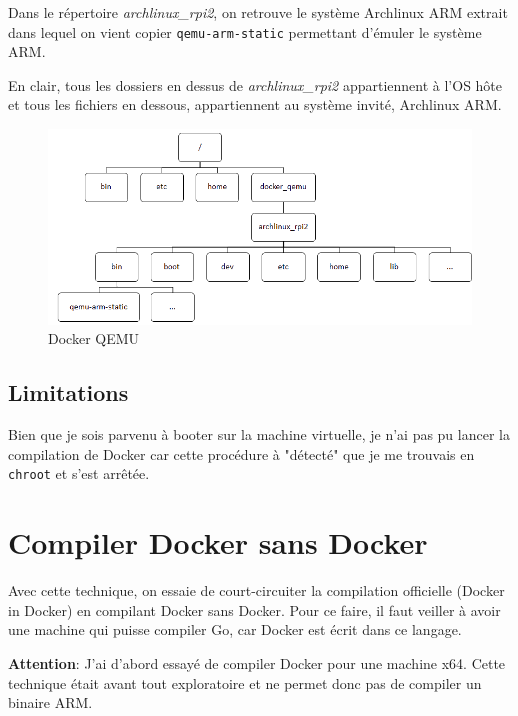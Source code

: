 \documentclass[11pt,a4paper,oneside]{report}
\newcommand{\code}[1]{\texttt{#1}} %
\begin{document}
Dans le répertoire \textit{archlinux\_rpi2}, on retrouve le système Archlinux ARM extrait dans lequel on vient copier \code{qemu-arm-static} permettant d'émuler le système ARM.

En clair, tous les dossiers en dessus de \textit{archlinux\_rpi2} appartiennent à l'OS hôte et tous les fichiers en dessous, appartiennent au système invité, Archlinux ARM.

\begin{figure}[H]
\begin{center}
        \includegraphics[scale=0.6]{img/chroot_archlinux_rpi}
        \caption{Docker QEMU}
        \label{fig_chroot_qemu}
    \end{center}
\end{figure}


\subsection{Limitations}

Bien que je sois parvenu à booter sur la machine virtuelle, je n'ai pas pu lancer la compilation de Docker car cette procédure à "détecté" que je me trouvais en \code{chroot} et s'est arrêtée.

\section{Compiler Docker sans Docker}

Avec cette technique, on essaie de court-circuiter la compilation officielle (Docker in Docker) en compilant Docker sans Docker. Pour ce faire, il faut veiller à avoir une machine qui puisse compiler Go, car Docker est écrit dans ce langage.

\textbf{Attention}: J'ai d'abord essayé de compiler Docker pour une machine x64. Cette technique était avant tout exploratoire et ne permet donc pas de compiler un binaire ARM.
\end{document}
